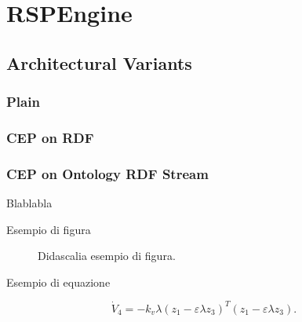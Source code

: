 \chapter{RSPEngine}


\section{Architectural Variants}
\subsection{Plain}
\subsection{CEP on RDF}
\subsection{CEP on Ontology RDF Stream}

Blablabla

Esempio di figura

\begin{figure}[ht]
\centerline{}
\caption{Didascalia esempio di figura.}
\label{fig:esempio}
\end{figure}

Esempio di equazione

\begin{equation}
\dot V_4= - k_v \lambda (z_1- \varepsilon \lambda z_3)^T(z_1-
\varepsilon \lambda z_3).
\end{equation}
